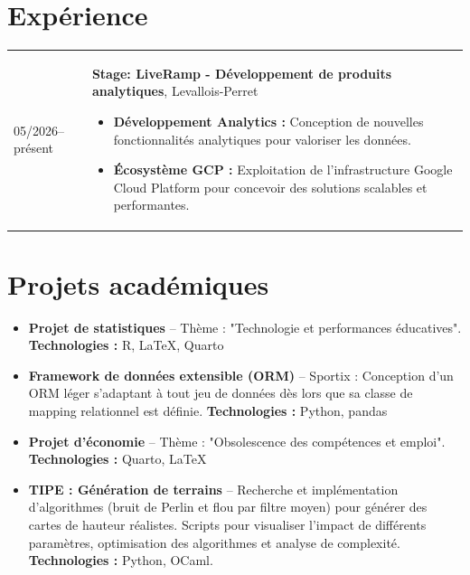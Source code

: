 \documentclass[11pt,a4paper]{article}
\begin{document}
\section*{Expérience}

\begin{tabularx}{\textwidth}{@{}p{2.5cm} X@{}}
05/2026--présent & \textbf{Stage: LiveRamp - Développement de produits analytiques}, Levallois-Perret 
  \begin{itemize}[leftmargin=0.4cm, itemsep=1pt, topsep=0pt]
    \item \textbf{Développement Analytics :} Conception de nouvelles fonctionnalités analytiques pour valoriser les données.
    \item \textbf{Écosystème GCP :} Exploitation de l'infrastructure Google Cloud Platform pour concevoir des solutions scalables et performantes.
  \end{itemize} \\
\end{tabularx}

\section*{Projets académiques}
\vspace{-0.1cm}
\begin{itemize}[leftmargin=0.4cm, itemsep=4pt]
    \item \textbf{Projet de statistiques} -- Thème : "Technologie et performances éducatives".
    \textbf{Technologies :} R, \LaTeX, Quarto
    \item \textbf{Framework de données extensible (ORM)} -- Sportix : Conception d'un ORM léger s'adaptant à tout jeu de données dès lors que sa classe de mapping relationnel est définie.
    \textbf{Technologies :} Python, pandas
    \item \textbf{Projet d'économie} -- Thème : "Obsolescence des compétences et emploi".
    \textbf{Technologies :} Quarto, \LaTeX
    \item \textbf{TIPE : Génération de terrains} -- Recherche et implémentation d'algorithmes (bruit de Perlin et flou par filtre moyen) pour générer des cartes de hauteur réalistes. Scripts pour visualiser l'impact de différents paramètres, optimisation des algorithmes et analyse de complexité.
    \textbf{Technologies :} Python, OCaml.
\end{itemize}
\end{document}
